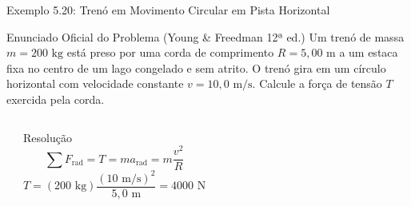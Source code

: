 \documentclass[10pt,aspectratio=169]{beamer}
\begin{document}
\begin{frame}{Exemplo 5.20: Trenó em Movimento Circular em Pista Horizontal}
    \begin{block}{Enunciado Oficial do Problema (Young \& Freedman 12ª ed.)}
        \small
        Um trenó de massa $m = 200\text{ kg}$ está preso por uma corda de comprimento $R = 5{,}00\text{ m}$ a um estaca fixa no centro de um lago congelado e sem atrito. O trenó gira em um círculo horizontal com velocidade constante $v = 10{,}0\text{ m/s}$. Calcule a força de tensão $T$ exercida pela corda.
    \end{block}
    \begin{columns}[T]
        \begin{center}
        \end{center}
        \begin{exampleblock}{Resolução}
            \small
            $$\sum F_{\text{rad}} = T = m a_{\text{rad}} = m \frac{v^2}{R}$$
            $$T = (200\text{ kg}) \frac{(10\text{ m/s})^2}{5{,}0\text{ m}} = 4000\text{ N}$$
        \end{exampleblock}
    \end{columns}
\end{frame}
\end{document}
